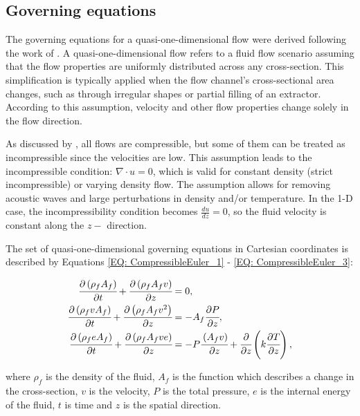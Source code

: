 \documentclass[a4paper,fleqn]{cas-dc}
\begin{document}
	\subsection{Governing equations} \label{CH:Governing_equations_chapter}
	The governing equations for a quasi-one-dimensional flow were derived following the work of \citet{Anderson1995}. A quasi-one-dimensional flow refers to a fluid flow scenario assuming that the flow properties are uniformly distributed across any cross-section. This simplification is typically applied when the flow channel's cross-sectional area changes, such as through irregular shapes or partial filling of an extractor. According to this assumption, velocity and other flow properties change solely in the flow direction.
	
	As discussed by \citet{Anderson2023}, all flows are compressible, but some of them can be treated as incompressible since the velocities are low. This assumption leads to the incompressible condition: $\nabla \cdot u =0$, which is valid for constant density (strict incompressible) or varying density flow. The assumption allows for removing acoustic waves and large perturbations in density and/or temperature. In the 1-D case, the incompressibility condition becomes $\frac{du}{dz} = 0$, so the fluid velocity is constant along the $z-$ direction.
	
	The set of quasi-one-dimensional governing equations in Cartesian coordinates is described by Equations \ref{EQ: CompressibleEuler_1} - \ref{EQ: CompressibleEuler_3}:
	
	{\footnotesize
		\begin{align}
			\label{EQ: CompressibleEuler_1}
			\cfrac{\partial \left( \rho_f A_f \right) }{\partial t} + \cfrac{\partial \left( \rho_f A_f v \right)}{\partial z} &= 0, \\
			\cfrac{\partial \left( \rho_f v A_f \right) }{\partial t} + \cfrac{\partial \left( \rho_f A_f v^2 \right)}{\partial z} &= -A_f \cfrac{\partial P}{\partial z} \label{EQ: CompressibleEuler_2}, \\
			\cfrac{\partial \left( \rho_f e A_f \right) }{\partial t} + \cfrac{\partial \left( \rho_f A_f v e\right)}{\partial z} &= -P\cfrac{\left( A_f v \right)}{\partial z} + \cfrac{\partial}{\partial z} \left( k \cfrac{\partial T}{\partial z} \right),   
			\label{EQ: CompressibleEuler_3}
		\end{align}  
	}
	
	where $\rho_f$ is the density of the fluid, $A_f$ is the function which describes a change in the cross-section, $v$ is the velocity, $P$ is the total pressure, $e$ is the internal energy of the fluid, $t$ is time and $z$ is the spatial direction.
	
\end{document}
